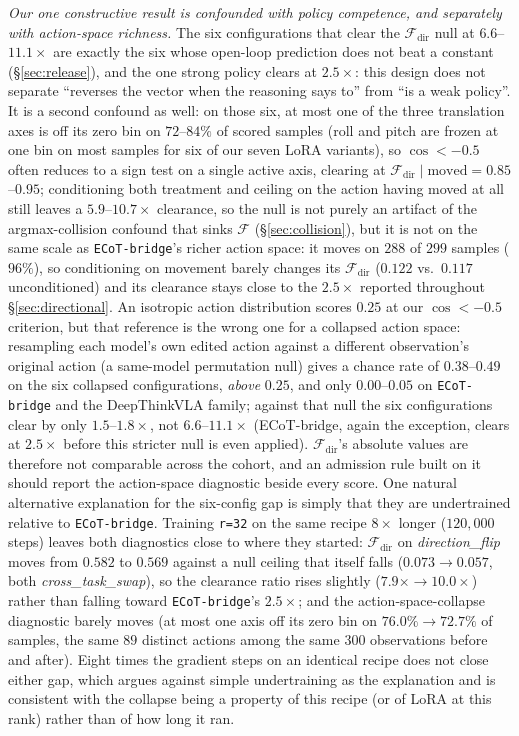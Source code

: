 \emph{Our one constructive result is confounded with policy competence, and separately with action-space richness.} The six configurations that clear the $\mathcal{F}_{\text{dir}}$ null at $6.6$--$11.1\times$ are exactly the six whose open-loop prediction does not beat a constant (\S\ref{sec:release}), and the one strong policy clears at $2.5\times$: this design does not separate ``reverses the vector when the reasoning says to'' from ``is a weak policy''. It is a second confound as well: on those six, at most one of the three translation axes is off its zero bin on $72$--$84\%$ of scored samples (roll and pitch are frozen at one bin on most samples for six of our seven LoRA variants), so $\cos < -0.5$ often reduces to a sign test on a single active axis, clearing at $\mathcal{F}_{\text{dir}} \mid \text{moved} = 0.85$--$0.95$; conditioning both treatment and ceiling on the action having moved at all still leaves a $5.9$--$10.7\times$ clearance, so the null is not purely an artifact of the argmax-collision confound that sinks $\mathcal{F}$ (\S\ref{sec:collision}), but it is not on the same scale as \texttt{ECoT-bridge}'s richer action space: it moves on $288$ of $299$ samples ($96\%$), so conditioning on movement barely changes its $\mathcal{F}_{\text{dir}}$ ($0.122$ vs.\ $0.117$ unconditioned) and its clearance stays close to the $2.5\times$ reported throughout \S\ref{sec:directional}. An isotropic action distribution scores $0.25$ at our $\cos < -0.5$ criterion, but that reference is the wrong one for a collapsed action space: resampling each model's own edited action against a different observation's original action (a same-model permutation null) gives a chance rate of $0.38$--$0.49$ on the six collapsed configurations, \emph{above} $0.25$, and only $0.00$--$0.05$ on \texttt{ECoT-bridge} and the DeepThinkVLA family; against that null the six configurations clear by only $1.5$--$1.8\times$, not $6.6$--$11.1\times$ (ECoT-bridge, again the exception, clears at $2.5\times$ before this stricter null is even applied). $\mathcal{F}_{\text{dir}}$'s absolute values are therefore not comparable across the cohort, and an admission rule built on it should report the action-space diagnostic beside every score. One natural alternative explanation for the six-config gap is simply that they are undertrained relative to \texttt{ECoT-bridge}. Training \texttt{r=32} on the same recipe $8\times$ longer ($120{,}000$ steps) leaves both diagnostics close to where they started: $\mathcal{F}_{\text{dir}}$ on \emph{direction\_flip} moves from $0.582$ to $0.569$ against a null ceiling that itself falls ($0.073\to0.057$, both \emph{cross\_task\_swap}), so the clearance ratio rises slightly ($7.9\times\to10.0\times$) rather than falling toward \texttt{ECoT-bridge}'s $2.5\times$; and the action-space-collapse diagnostic barely moves (at most one axis off its zero bin on $76.0\%\to72.7\%$ of samples, the same $89$ distinct actions among the same $300$ observations before and after). Eight times the gradient steps on an identical recipe does not close either gap, which argues against simple undertraining as the explanation and is consistent with the collapse being a property of this recipe (or of LoRA at this rank) rather than of how long it ran.

